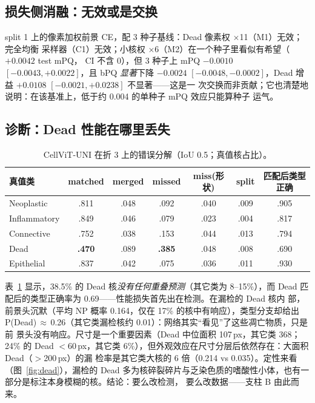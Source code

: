 \documentclass[11pt]{article}
\begin{document}
\subsection{损失侧消融：无效或是交换}
split 1 上的像素加权前景 CE，配 3 种子基线：Dead 像素权 $\times$11（M1）无效；完全均衡
采样器（C1）无效；小核权 $\times$6（M2）在一个种子里看似有希望（$+0.0042$ test mPQ，
CI 不含 0），但 3 种子上 mPQ $-0.0010$ $[-0.0043,+0.0022]$，且 bPQ \emph{显著}下降
$-0.0024$ $[-0.0048,-0.0002]$，Dead 增益 $+0.0108$ $[-0.0021,+0.0238]$ 不显著——这是一
次交换而非贡献；它也清楚地说明：在该基准上，低于约 0.004 的单种子 mPQ 效应只能算种子
运气。

\subsection{诊断：Dead 性能在哪里丢失}
\label{sec:diagnosis}

\begin{table}[t]
\centering\small
\caption{CellViT-UNI 在折 3 上的错误分解（IoU 0.5；真值核占比）。}
\label{tab:decomp}
\begin{tabular}{lcccccc}
\toprule
真值类 & matched & merged & missed & miss(形状) & split & 匹配后类型正确 \\
\midrule
Neoplastic   & .811 & .048 & .092 & .040 & .009 & .905 \\
Inflammatory & .849 & .046 & .079 & .023 & .004 & .817 \\
Connective   & .752 & .038 & .153 & .044 & .013 & .794 \\
Dead         & \textbf{.470} & .089 & \textbf{.385} & .048 & .008 & .690 \\
Epithelial   & .837 & .042 & .075 & .036 & .011 & .930 \\
\bottomrule
\end{tabular}
\end{table}

表~\ref{tab:decomp} 显示，38.5\% 的 Dead 核\emph{没有任何重叠预测}（其它类为
8--15\%），而 Dead 匹配后的类型正确率为 0.69——性能损失首先出在检测。在漏检的 Dead 核内
部，前景头沉默（平均 NP 概率 0.164，仅在 17\% 的核中有响应），类型分支却给出
P(Dead)\,$\approx$\,0.26（其它类漏检核约 0.01）：网络其实“看见”了这些凋亡物质，只是前
景头没有响应。尺寸是一个重要因素（Dead 中位面积 107\,px，其它类 368；24\% 的 Dead
$<$60\,px，其它类 6\%），但外观效应在尺寸分层后依然存在：大面积 Dead（$>$200\,px）的漏
检率是其它类大核的 6 倍（0.214 vs 0.035）。定性来看（图~\ref{fig:dead}），漏检的 Dead
多为核碎裂碎片与乏染色质的嗜酸性小体，也有一部分是标注本身模糊的核。结论：要么改检测，
要么改数据——支柱 B 由此而来。
\end{document}
